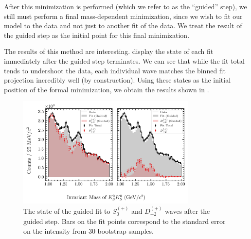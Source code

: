 After this minimization is performed (which we refer to as the ``guided'' step), we still must perform a final mass-dependent minimization, since we wish to fit our model to the data and not just to another fit of the data. We treat the result of the guided step as the initial point for this final minimization.

The results of this method are interesting.  display the state of each fit immediately after the guided step terminates. We can see that while the fit total tends to undershoot the data, each individual wave matches the binned fit projection incredibly well (by construction). Using these states as the initial position of the formal minimization, we obtain the results shown in .

\begin{figure}
  \begin{center}
    \includegraphics[width=0.8\textwidth]{figures/guided_fit_chisqdof_3.4_splot_D_1s_2b_phase_factor_waves491_uncertainty_bootstrap-SE.png}
  \end{center}
  \caption{The state of the guided fit to $S_{0}^{(+)}$ and $D_{+2}^{(+)}$ waves after the guided step. Bars on the fit points correspond to the standard error on the intensity from $ 30 $ bootstrap samples.}\label{fig:guided-fit-chisqdof-3.4-Sp-D2p}
\end{figure}

